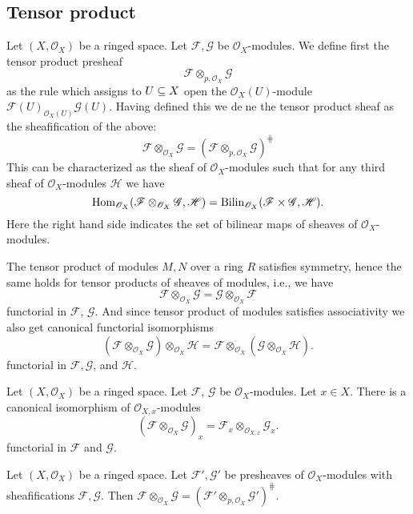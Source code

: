 \subsection{Tensor product}
Let $(X,\mathscr{O}_X)$ be a ringed space. Let $\mathscr{F},\mathscr{G}$ be $\mathscr{O}_X$-modules. We define first the tensor product presheaf
\[\mathscr{F}\otimes_{p,\mathscr{O}_X}\mathscr{G}\]
as the rule which assigns to $U\subseteq X$ open the $\mathscr{O}_X(U)$-module $\mathscr{F}(U)_{\mathscr{O}_X(U)}\mathscr{G}(U)$. Having defined this we dene the tensor product sheaf as the sheafification of the above:
\[\mathscr{F}\otimes_{\mathscr{O}_X}\mathscr{G}=(\mathscr{F}\otimes_{p,\mathscr{O}_X}\mathscr{G})^{\hash}\]
This can be characterized as the sheaf of $\mathscr{O}_X$-modules such that for any third sheaf of $\mathscr{O}_X$-modules $\mathscr{H}$ we have
\[\mathrm{Hom}_{\mathscr{O}_X}(\mathscr{F}\otimes_{\mathscr{O}_X}\mathscr{G},\mathscr{H})=\mathrm{Bilin}_{\mathscr{O}_X}(\mathscr{F}\times\mathscr{G},\mathscr{H}).\]
Here the right hand side indicates the set of bilinear maps of sheaves of $\mathscr{O}_X$-modules.\par
The tensor product of modules $M,N$ over a ring $R$ satisfies symmetry, hence the same holds for tensor products of sheaves of modules, i.e., we have
\[\mathscr{F}\otimes_{\mathscr{O}_X}\mathscr{G}=\mathscr{G}\otimes_{\mathscr{O}_X}\mathscr{F}\]
functorial in $\mathscr{F}$, $\mathscr{G}$. And since tensor product of modules satisfies associativity we also get canonical functorial isomorphisms
\[(\mathscr{F}\otimes_{\mathscr{O}_X}\mathscr{G})\otimes_{\mathscr{O}_X}\mathscr{H}=\mathscr{F}\otimes_{\mathscr{O}_X}(\mathscr{G}\otimes_{\mathscr{O}_X}\mathscr{H}).\]
functorial in $\mathscr{F},\mathscr{G}$, and $\mathscr{H}$.
\begin{proposition}
Let $(X,\mathscr{O}_X)$ be a ringed space. Let $\mathscr{F}$, $\mathscr{G}$ be $\mathscr{O}_X$-modules. Let $x\in X$. There is a canonical isomorphism of $\mathscr{O}_{X,x}$-modules
\[(\mathscr{F}\otimes_{\mathscr{O}_{X}}\mathscr{G})_x=\mathscr{F}_x\otimes_{\mathscr{O}_{X,x}}\mathscr{G}_x.\]
functorial in $\mathscr{F}$ and $\mathscr{G}$.
\end{proposition}
\begin{proposition}
Let $(X,\mathscr{O}_X)$ be a ringed space. Let $\mathscr{F}',\mathscr{G}'$ be presheaves of $\mathscr{O}_X$-modules with sheafifications $\mathscr{F},\mathscr{G}$. Then $\mathscr{F}\otimes_{\mathscr{O}_{X}}\mathscr{G}=(\mathscr{F}'\otimes_{p,\mathscr{O}_{X}}\mathscr{G}')^{\hash}$.
\end{proposition}
